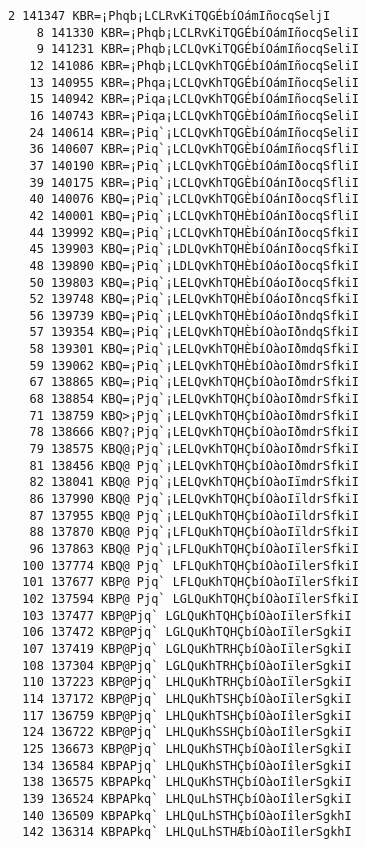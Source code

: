 \documentclass[11pt]{article}
\begin{document}
    \begin{Verbatim}[commandchars=\\\{\}]
    2 141347 KBR=¡Phqb¡LCLRvKiTQGÉbíOámIñocqSeljI
    8 141330 KBR=¡Phqb¡LCLRvKiTQGÉbíOámIñocqSeliI
    9 141231 KBR=¡Phqb¡LCLQvKiTQGÉbíOámIñocqSeliI
   12 141086 KBR=¡Phqb¡LCLQvKhTQGÉbíOámIñocqSeliI
   13 140955 KBR=¡Phqa¡LCLQvKhTQGÉbíOámIñocqSeliI
   15 140942 KBR=¡Piqa¡LCLQvKhTQGÉbíOámIñocqSeliI
   16 140743 KBR=¡Piqa¡LCLQvKhTQGÈbíOámIñocqSeliI
   24 140614 KBR=¡Piq`¡LCLQvKhTQGÈbíOámIñocqSeliI
   36 140607 KBR=¡Piq`¡LCLQvKhTQGÈbíOámIñocqSfliI
   37 140190 KBR=¡Piq`¡LCLQvKhTQGÈbíOámIðocqSfliI
   39 140175 KBR=¡Piq`¡LCLQvKhTQGÈbíOánIðocqSfliI
   40 140076 KBQ=¡Piq`¡LCLQvKhTQGÈbíOánIðocqSfliI
   42 140001 KBQ=¡Piq`¡LCLQvKhTQHÈbíOánIðocqSfliI
   44 139992 KBQ=¡Piq`¡LCLQvKhTQHÈbíOánIðocqSfkiI
   45 139903 KBQ=¡Piq`¡LDLQvKhTQHÈbíOánIðocqSfkiI
   48 139890 KBQ=¡Piq`¡LDLQvKhTQHÈbíOáoIðocqSfkiI
   50 139803 KBQ=¡Piq`¡LELQvKhTQHÈbíOáoIðocqSfkiI
   52 139748 KBQ=¡Piq`¡LELQvKhTQHÈbíOáoIðncqSfkiI
   56 139739 KBQ=¡Piq`¡LELQvKhTQHÈbíOáoIðndqSfkiI
   57 139354 KBQ=¡Piq`¡LELQvKhTQHÈbíOàoIðndqSfkiI
   58 139301 KBQ=¡Piq`¡LELQvKhTQHÈbíOàoIðmdqSfkiI
   59 139062 KBQ=¡Piq`¡LELQvKhTQHÈbíOàoIðmdrSfkiI
   67 138865 KBQ=¡Piq`¡LELQvKhTQHÇbíOàoIðmdrSfkiI
   68 138854 KBQ=¡Pjq`¡LELQvKhTQHÇbíOàoIðmdrSfkiI
   71 138759 KBQ>¡Pjq`¡LELQvKhTQHÇbíOàoIðmdrSfkiI
   78 138666 KBQ?¡Pjq`¡LELQvKhTQHÇbíOàoIðmdrSfkiI
   79 138575 KBQ@¡Pjq`¡LELQvKhTQHÇbíOàoIðmdrSfkiI
   81 138456 KBQ@ Pjq`¡LELQvKhTQHÇbíOàoIðmdrSfkiI
   82 138041 KBQ@ Pjq`¡LELQvKhTQHÇbíOàoIïmdrSfkiI
   86 137990 KBQ@ Pjq`¡LELQvKhTQHÇbíOàoIïldrSfkiI
   87 137955 KBQ@ Pjq`¡LELQuKhTQHÇbíOàoIïldrSfkiI
   88 137870 KBQ@ Pjq`¡LFLQuKhTQHÇbíOàoIïldrSfkiI
   96 137863 KBQ@ Pjq`¡LFLQuKhTQHÇbíOàoIïlerSfkiI
  100 137774 KBQ@ Pjq` LFLQuKhTQHÇbíOàoIïlerSfkiI
  101 137677 KBP@ Pjq` LFLQuKhTQHÇbíOàoIïlerSfkiI
  102 137594 KBP@ Pjq` LGLQuKhTQHÇbíOàoIïlerSfkiI
  103 137477 KBP@Pjq` LGLQuKhTQHÇbíOàoIïlerSfkiI
  106 137472 KBP@Pjq` LGLQuKhTQHÇbíOàoIïlerSgkiI
  107 137419 KBP@Pjq` LGLQuKhTRHÇbíOàoIïlerSgkiI
  108 137304 KBP@Pjq` LGLQuKhTRHÇbíOàoIïlerSgkiI
  110 137223 KBP@Pjq` LHLQuKhTRHÇbíOàoIïlerSgkiI
  114 137172 KBP@Pjq` LHLQuKhTSHÇbíOàoIïlerSgkiI
  117 136759 KBP@Pjq` LHLQuKhTSHÇbíOàoIîlerSgkiI
  124 136722 KBP@Pjq` LHLQuKhSSHÇbíOàoIîlerSgkiI
  125 136673 KBP@Pjq` LHLQuKhSTHÇbíOàoIîlerSgkiI
  134 136584 KBPAPjq` LHLQuKhSTHÇbíOàoIîlerSgkiI
  138 136575 KBPAPkq` LHLQuKhSTHÇbíOàoIîlerSgkiI
  139 136524 KBPAPkq` LHLQuLhSTHÇbíOàoIîlerSgkiI
  140 136509 KBPAPkq` LHLQuLhSTHÇbíOàoIîlerSgkhI
  142 136314 KBPAPkq` LHLQuLhSTHÆbíOàoIîlerSgkhI

\end{Verbatim}
\end{document}
